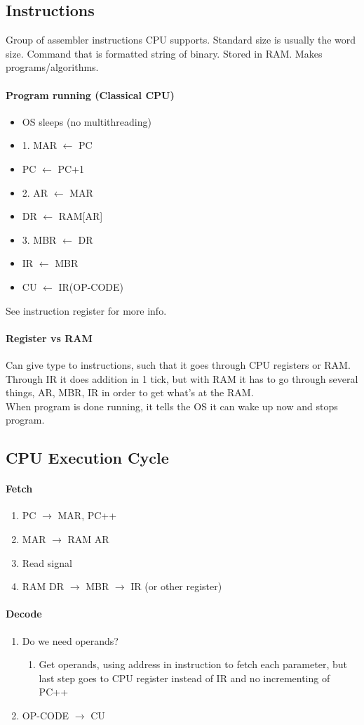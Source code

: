 \documentclass[12 pt]{article}
\begin{document}
	\subsection{Instructions}
	Group of assembler instructions CPU supports. Standard size is usually the word size. Command that is formatted string of binary. Stored in RAM. Makes programs/algorithms.
	\paragraph{Program running (Classical CPU)}
	\begin{itemize}
		\item OS sleeps (no multithreading)
		\item 1. MAR $\gets$ PC
		\item PC $\gets$ PC+1
		\item 2. AR $\gets$ MAR
		\item DR $\gets$ RAM[AR]
		\item 3. MBR $\gets$ DR
		\item IR $\gets$ MBR
		\item CU $\gets$ IR(OP-CODE)
		\end{itemize}
	See instruction register for more info.
	\paragraph{Register vs RAM}
	Can give type to instructions, such that it goes through CPU registers or RAM. Through IR it does addition in 1 tick, but with RAM it has to go through several things, AR, MBR, IR in order to get what's at the RAM.
	\\ When program is done running, it tells the OS it can wake up now and stops program.
	\subsection{CPU Execution Cycle}
	\paragraph{Fetch}
	\begin{enumerate}
		\item PC $\to$ MAR, PC++
		\item MAR $\to$ RAM AR
		\item Read signal
		\item RAM DR $\to$ MBR $\to$ IR (or other register)
	\end{enumerate}
	\paragraph{Decode}
		\begin{enumerate}
			\item Do we need operands?
			\begin{enumerate}
				\item Get operands, using address in instruction to fetch each parameter, but last step goes to CPU register instead of IR and no incrementing of PC++
			\end{enumerate}
			\item OP-CODE $\to$ CU
		\end{enumerate}
\end{document}
